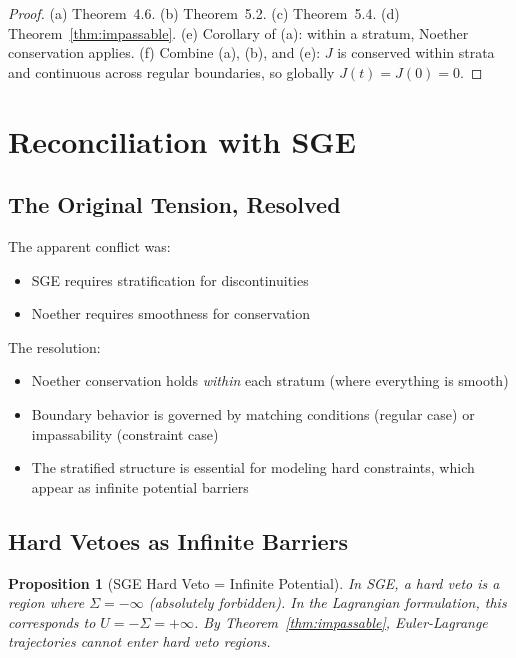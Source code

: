 \documentclass[11pt,a4paper]{article}
\newtheorem{proposition}[theorem]{Proposition}
\begin{document}
\begin{proof}
(a) Theorem~4.6. (b) Theorem~5.2. (c) Theorem~5.4. (d) Theorem~\ref{thm:impassable}. (e) Corollary of (a): within a stratum, Noether conservation applies. (f) Combine (a), (b), and (e): $J$ is conserved within strata and continuous across regular boundaries, so globally $J(t) = J(0) = 0$.
\end{proof}

\section{Reconciliation with SGE}\label{sec:reconciliation}

\subsection{The Original Tension, Resolved}

The apparent conflict was:
\begin{itemize}
    \item SGE requires stratification for discontinuities
    \item Noether requires smoothness for conservation
\end{itemize}

The resolution:
\begin{itemize}
    \item Noether conservation holds \textit{within} each stratum (where everything is smooth)
    \item Boundary behavior is governed by matching conditions (regular case) or impassability (constraint case)
    \item The stratified structure is essential for modeling hard constraints, which appear as infinite potential barriers
\end{itemize}

\subsection{Hard Vetoes as Infinite Barriers}

\begin{proposition}[SGE Hard Veto = Infinite Potential]
In SGE, a hard veto is a region where $\Sigma = -\infty$ (absolutely forbidden). In the Lagrangian formulation, this corresponds to $U = -\Sigma = +\infty$. By Theorem~\ref{thm:impassable}, Euler-Lagrange trajectories cannot enter hard veto regions.
\end{proposition}
\end{document}
